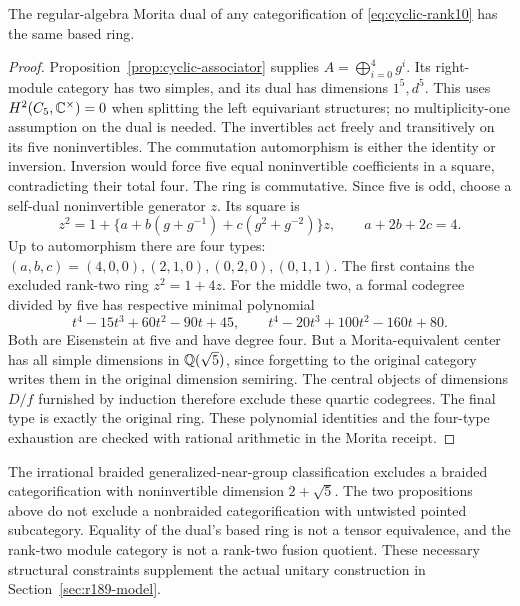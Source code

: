 \begin{proposition}
The regular-algebra Morita dual of any categorification of
\eqref{eq:cyclic-rank10} has the same based ring.
\end{proposition}
\begin{proof}
Proposition~\ref{prop:cyclic-associator} supplies $A=\bigoplus_{i=0}^4g^i$.
Its right-module category has two simples, and its dual has dimensions
$1^5,d^5$. This uses $H^2(C_5,\mathbb C^\times)=0$ when splitting the
left equivariant structures; no multiplicity-one assumption on the dual
is needed. The invertibles act freely and transitively on its five
noninvertibles. The commutation automorphism is either the identity or
inversion. Inversion would force five equal noninvertible coefficients
in a square, contradicting their total four. The ring is commutative.
Since five is odd, choose a self-dual noninvertible generator $z$.
Its square is
\[
 z^2=1+\{a+b(g+g^{-1})+c(g^2+g^{-2})\}z,
 \qquad a+2b+2c=4.
\]
Up to automorphism there are four types:
$(a,b,c)=(4,0,0),(2,1,0),(0,2,0),(0,1,1)$.
The first contains the excluded rank-two ring $z^2=1+4z$.
For the middle two, a formal codegree divided by five has respective
minimal polynomial
\[
 t^4-15t^3+60t^2-90t+45,\qquad
 t^4-20t^3+100t^2-160t+80.
\]
Both are Eisenstein at five and have degree four. But a Morita-equivalent
center has all simple dimensions in $\mathbb Q(\sqrt5)$, since forgetting to
the original category writes them in the original dimension semiring.
The central objects of dimensions $D/f$ furnished by induction therefore
exclude these quartic codegrees. The final type is exactly the original
ring. These polynomial identities and the four-type exhaustion are
checked with rational arithmetic in the Morita receipt.
\end{proof}

The irrational braided generalized-near-group classification
\cite[Theorem~3.6]{SchopierayBraided} excludes a braided categorification
with noninvertible dimension $2+\sqrt5$. The two propositions above
do not exclude a nonbraided categorification with untwisted pointed
subcategory. Equality of the dual's based ring is not a tensor
equivalence, and the rank-two module category is not a rank-two fusion
quotient. These necessary structural constraints supplement the actual unitary construction in Section~\ref{sec:r189-model}.

